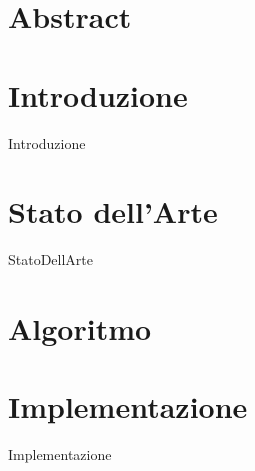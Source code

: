 \documentclass[12pt,oneside]{report}
\begin{document}
 
	                
	\begin{titlepage}
		
	\end{titlepage} 
    
    
	\chapter*{Abstract}
	
    \tableofcontents{}
    \listoftables
    \listoflistings
    \newpage
    \chapter{Introduzione}
    {Introduzione}
    \chapter{Stato dell'Arte}
    {StatoDellArte}
    \chapter{Algoritmo}
    \chapter{Implementazione}
    {Implementazione}
    
 
     
    
\end{document}
